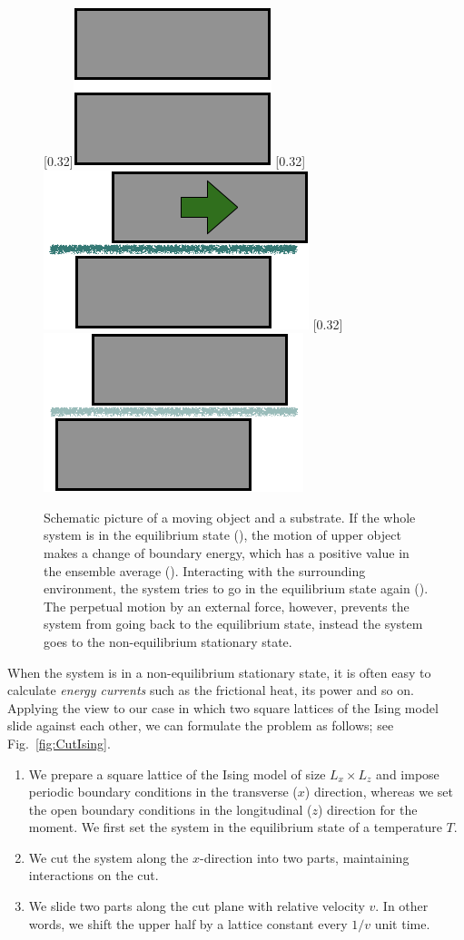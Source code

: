 \begin{figure}[htbp]
	\centering
	\subcaptionbox{\label{subcap:schemNESS1}}[0.32\linewidth]{\includegraphics[height=0.15\linewidth]{schemNESS1.png}}
	\subcaptionbox{\label{subcap:schemNESS2}}[0.32\linewidth]{\includegraphics[height=0.15\linewidth]{schemNESS2.png}}
	\subcaptionbox{\label{subcap:schemNESS3}}[0.32\linewidth]{\includegraphics[height=0.15\linewidth]{schemNESS3.png}}
	
	\caption{Schematic picture of a moving object and a substrate. If the whole system is in the equilibrium state (), the motion of upper object makes a change of boundary energy, which has a positive value in the ensemble average (). Interacting with the surrounding environment, the system tries to go in the equilibrium state again (). The perpetual motion by an external force, however, prevents the system from going back to the equilibrium state, instead the system goes to the non-equilibrium stationary state.}
	\label{fig:schemNESS}
\end{figure}

When the system is in a non-equilibrium stationary state, it is often easy to calculate \textit{energy currents} such as the frictional heat, its power and so on. Applying the view to our case in which two square lattices of the Ising model slide against each other, we can formulate the problem as follows; see Fig.~\ref{fig:CutIsing}.
\begin{enumerate}
	\item We prepare a square lattice of the Ising model of size $L_{x}\times L_{z}$ and impose periodic boundary conditions in the transverse ($x$) direction, whereas we set the open boundary conditions in the longitudinal ($z$) direction for the moment. We first set the system in the equilibrium state of a temperature $T$.
	\item We cut the system along the $x$-direction into two parts, maintaining interactions on the cut.
	\item We slide two parts along the cut plane with relative velocity $v$. In other words, we shift the upper half by a lattice constant every $1/v$ unit time. 
\end{enumerate}

